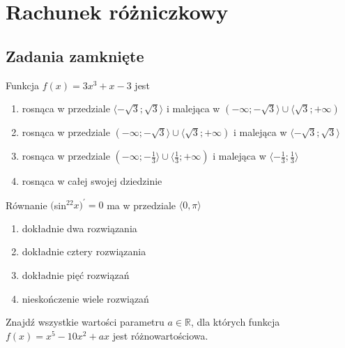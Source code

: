 \setcounter{parc}{0}
\addtocounter{chapc}{1}

\chapter{Rachunek różniczkowy}

\section{Zadania zamknięte}

\zadanie Funkcja $f(x) = 3x^3 + x - 3$ jest
\begin{enumerate}[label=\alph*)]
	\item rosnąca w przedziale $ \langle -\sqrt{3}; \sqrt{3} \rangle $ i malejąca w $ ( -\infty; -\sqrt{3} \rangle \cup \langle \sqrt{3}; +\infty ) $
	\item rosnąca w przedziale $ ( -\infty; -\sqrt{3} \rangle \cup \langle \sqrt{3}; +\infty ) $ i malejąca w $ \langle -\sqrt{3}; \sqrt{3} \rangle $
	\item rosnąca w przedziale $ ( -\infty; -\frac{1}{3} \rangle \cup \langle \frac{1}{3}; +\infty ) $ i malejąca w $ \langle -\frac{1}{3}; \frac{1}{3} \rangle $
	\item rosnąca w całej swojej dziedzinie
\end{enumerate}

\zadanie Równanie $($sin$^22x)^{'}=0$ ma w przedziale $\langle 0, \pi \rangle$
\begin{enumerate}[label=\alph*)]
	\item dokładnie dwa rozwiązania
	\item dokładnie cztery rozwiązania
	\item dokładnie pięć rozwiązań %
	\item nieskończenie wiele rozwiązań
\end{enumerate}

\zadanie Znajdź wszystkie wartości parametru $a\in\mathbb{R}$, dla których funkcja $f(x) = x^5 - 10x^2 + ax$ jest różnowartościowa.